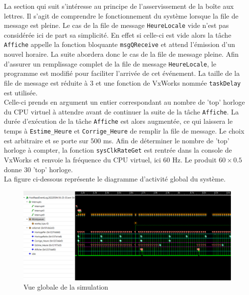 \documentclass[french]{article}
\begin{document}
	La section qui suit s'intéresse au principe de l'asservissement de la boîte aux lettres. Il s'agit de comprendre le fonctionnement du système lorsque la file de message est pleine. Le cas de la file de message \texttt{HeureLocale} vide n'est pas considérée ici de part sa simplicité. En effet si celle-ci est vide alors la tâche \texttt{Affiche} appelle la fonction bloquante \texttt{msgQReceive} et attend l'émission d'un nouvel horaire. La suite abordera donc le cas de la file de message pleine. Afin d'assurer un remplissage complet de la file de message \texttt{HeureLocale}, le programme est modifié pour faciliter l'arrivée de cet événement. La taille de la file de message est réduite à 3 et une fonction de VxWorks nommée \texttt{taskDelay} est utilisée.\\
	Celle-ci prends en argument un entier correspondant au nombre de 'top' horloge du CPU virtuel à attendre avant de continuer la suite de la tâche \texttt{Affiche}. La durée d'exécution de la tâche \texttt{Affiche} est alors augmentée, ce qui laissera le temps à \texttt{Estime\_Heure} et \texttt{Corrige\_Heure} de remplir la file de message. Le choix est arbitraire et se porte sur 500 ms. Afin de déterminer le nombre de 'top' horloge à compter, la fonction \texttt{sysClkRateGet} est rentrée dans la console de VxWorks et renvoie la fréquence du CPU virtuel, ici 60 Hz. Le produit $60\times0.5$ donne 30 'top' horloge.\\
	La figure ci-dessous représente le diagramme d'activité global du système.
	
	
	\begin{figure}[H]
		\centering
		\includegraphics[width=1\linewidth]{../affichage_ralenti/vue_globale.PNG}
		\caption{Vue globale de la simulation}
		\label{fig:vue_globale}
	\end{figure}
	
\end{document}
